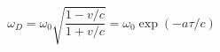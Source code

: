 \begin{equation}\label{yab2}
\omega_{D} = \omega_{0}\sqrt{\frac{1 - v/c}{1 +v/c}} =
\omega_{0}\exp({-a\tau/c})
\end{equation}

